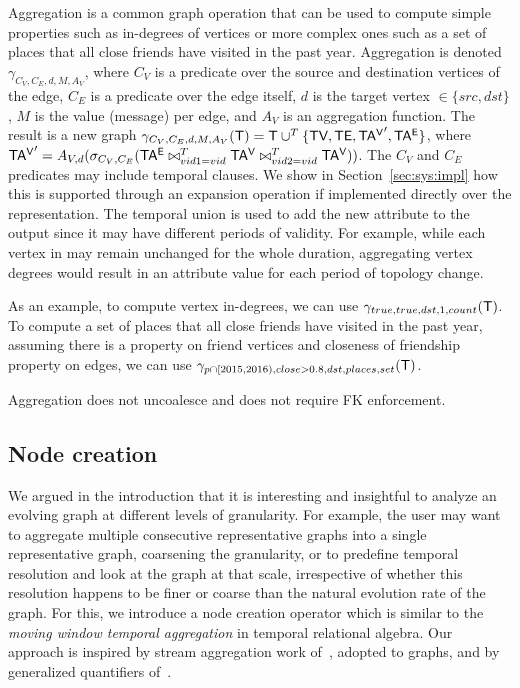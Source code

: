 Aggregation is a common graph operation that can be used to compute
simple properties such as in-degrees of vertices or more complex ones
such as a set of places that all close friends have visited in the
past year.  Aggregation is denoted $\gamma_{C_V,C_E,d,M,A_V}$, where
$C_V$ is a predicate over the source and destination vertices of the
edge, $C_E$ is a predicate over the edge itself, $d$ is the target
vertex $\in \{src,dst\}$, $M$ is the value (message) per edge, and $A_V$
is an aggregation function.  The result is a new graph
$\gamma_{C_V,C_E,d,M,A_V} (\mathsf{T}) = \mathsf{T} \cup^T \{ \textsf{TV}, \textsf{TE}, \mathsf{TA^{V}}',
\mathsf{TA^{E}} \}$, where $\mathsf{TA^{V}}' = A_{V,d}(\sigma_{C_V,C_E} (\mathsf{TA^{E}}
\bowtie^T_{vid1=vid} \mathsf{TA^{V}} \bowtie^T_{vid2=vid} \mathsf{TA^{V}}))$.  The $C_V$ and
$C_E$ predicates may include temporal clauses.  We show in
Section~\ref{sec:sys:impl} how this is supported through an expansion
operation if implemented directly over the \tve representation.  The
temporal union is used to add the new attribute to the output since it
may have different periods of validity.  For example, while each vertex
in \tg may remain unchanged for the whole duration, aggregating vertex
degrees would result in an attribute value for each period of topology
change.

As an example, to compute vertex in-degrees, we can use
$\gamma_{true,true,dst,1,count}(\mathsf{T})$.  To compute a set of places
that all close friends have visited in the past year, assuming there
is a property  on friend vertices and closeness of
friendship property on edges, we can use $\gamma_{p \cap
  [2015,2016),close > 0.8,dst,places,set}(\mathsf{T})$.

Aggregation does not uncoalesce and does not require FK enforcement.

\subsection{Node creation}
\label{sec:algebra:create}

We argued in the introduction that it is interesting and insightful to
analyze an evolving graph at different levels of granularity.  For
example, the user may want to aggregate multiple consecutive
representative graphs into a single representative graph, coarsening
the granularity, or to predefine temporal resolution and look at the
graph at that scale, irrespective of whether this resolution happens
to be finer or coarse than the natural evolution rate of the graph.
For this, we introduce a node creation operator which is similar to
the {\em moving window temporal aggregation} in temporal relational
algebra.  Our approach is inspired by stream aggregation work
of~\cite{Li2005}, adopted to graphs, and by generalized quantifiers
of~\cite{Hsu1995}.


